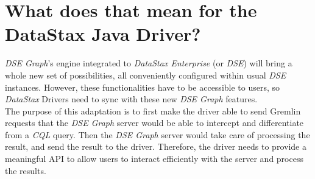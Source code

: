\documentclass[a4paper]{report}
\newcommand{\dseg}{\emph{DSE Graph\xspace}}
\begin{document}
\section{What does that mean for the DataStax Java Driver?}
\emph{DSE Graph}'s engine integrated to \emph{DataStax Enterprise} (or \emph{DSE}) will bring a whole new set of possibilities, all conveniently configured within usual \emph{DSE} instances. However, these functionalities have to be accessible to users, so \emph{DataStax} Drivers need to sync with these new \dseg{} features.\\
The purpose of this adaptation is to first make the driver able to send Gremlin requests that the \dseg{} server would be able to intercept and differentiate from a \emph{CQL} query. Then the \dseg{} server would take care of processing the result, and send the result to the driver. Therefore, the driver needs to provide a meaningful API to allow users to interact efficiently with the server and process the results.
\end{document}
